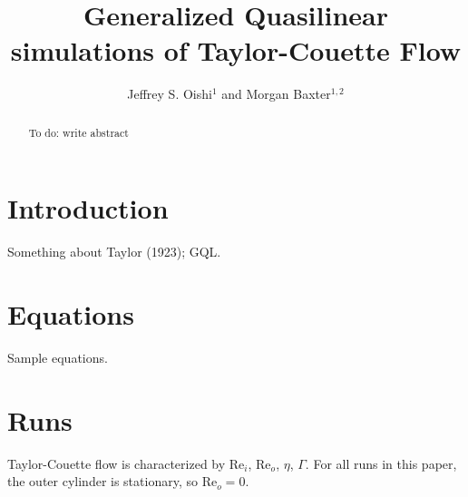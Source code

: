 \documentclass[openacc]{rstransa}%
\newcommand{\Reyn}{\mathrm{Re}}
\begin{document}
\title{Generalized Quasilinear simulations of Taylor-Couette Flow}

\author{%
Jeffrey S. Oishi$^{1}$ and Morgan Baxter$^{1,2}$}

\address{$^{1}$Department of Physics and Astronomy, Bates College, Lewiston, ME USA\\
$^{2}$Company Name, Whereever, USA}

\subject{xxxxx, xxxxx, xxxx}



\begin{abstract}
To do: write abstract
\end{abstract}


\begin{fmtext}
\section{Introduction}
Something about Taylor (1923); GQL.

\section{Equations}

Sample equations.

\end{fmtext}


\maketitle

\section{Runs}
Taylor-Couette flow is characterized by $\Reyn_i$, $\Reyn_o$, $\eta$, $\Gamma$. For all runs in this paper, the outer cylinder is stationary, so $\Reyn_o = 0$.
\end{document}
